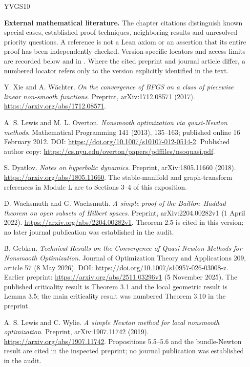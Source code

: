 \begin{thebibliography}{YVGS10}

\item[]\textbf{External mathematical literature.} The chapter citations distinguish known special cases, established proof techniques, neighboring results and unresolved priority questions. A reference is not a Lean axiom or an assertion that its entire proof has been independently checked. Version-specific locators and access limits are recorded below and in . Where the cited preprint and journal article differ, a numbered locator refers only to the version explicitly identified in the text.

 Y. Xie and A. W\"achter. \emph{On the convergence of BFGS on a class of piecewise linear non-smooth functions}. Preprint, arXiv:1712.08571 (2017). \url{https://arxiv.org/abs/1712.08571}.

 A. S. Lewis and M. L. Overton. \emph{Nonsmooth optimization via quasi-Newton methods}. Mathematical Programming 141 (2013), 135--163; published online 16 February 2012. DOI: \url{https://doi.org/10.1007/s10107-012-0514-2}. Published author copy: \url{https://cs.nyu.edu/overton/papers/pdffiles/nsoquasi.pdf}.

 S. Dyatlov. \emph{Notes on hyperbolic dynamics}. Preprint, arXiv:1805.11660 (2018). \url{https://arxiv.org/abs/1805.11660}. The stable-manifold and graph-transform references in Module L are to Sections 3--4 of this exposition.

 D. Wachsmuth and G. Wachsmuth. \emph{A simple proof of the Baillon--Haddad theorem on open subsets of Hilbert spaces}. Preprint, arXiv:2204.00282v1 (1 April 2022). \url{https://arxiv.org/abs/2204.00282v1}. Theorem 2.5 is cited in this version; no later journal publication was established in the audit.

 B. Gebken. \emph{Technical Results on the Convergence of Quasi-Newton Methods for Nonsmooth Optimization}. Journal of Optimization Theory and Applications 209, article 57 (8 May 2026). DOI: \url{https://doi.org/10.1007/s10957-026-03008-z}. Earlier preprint: \url{https://arxiv.org/abs/2511.03296v1} (5 November 2025). The published criticality result is Theorem 3.1 and the local geometric result is Lemma 3.5; the main criticality result was numbered Theorem 3.10 in the preprint.

 A. S. Lewis and C. Wylie. \emph{A simple Newton method for local nonsmooth optimization}. Preprint, arXiv:1907.11742 (2019). \url{https://arxiv.org/abs/1907.11742}. Propositions 5.5--5.6 and the bundle-Newton result are cited in the inspected preprint; no journal publication was established in the audit.


\end{thebibliography}
